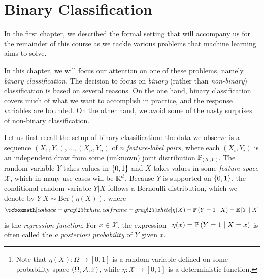 \chapter{Binary Classification}
\label{ch: binary classification}

In the first chapter, we described the formal setting that will accompany us for the remainder of this course as we tackle various problems that machine learning aims to solve.

In this chapter, we will focus our attention on one of these problems, namely \emph{binary classification}. The decision to focus on \emph{binary} (rather than \emph{non-binary}) classification is based on several reasons. On the one hand, binary classification covers much of what we want to accomplish in practice, and the response variables are bounded. On the other hand, we avoid some of the nasty surprises of non-binary classification.

Let us first recall the setup of binary classification: the data we observe is a sequence $(X_1, Y_1), \dots, (X_n, Y_n)$ of $n$ \emph{feature-label pairs}, where each $(X_i, Y_i)$ is an independent draw from some (unknown) joint distribution $\P_{(X, Y)}$. The random variable $Y$ takes values in $\set{0, 1}$ and $X$ takes values in some \emph{feature space} $\mathcal{X}$, which in many use cases will be $\R^d$. Because $Y$ is supported on $\set{0, 1}$, the conditional random variable $Y \vert X$ follows a Bernoulli distribution, which we denote by $Y \vert X \sim \mathrm{Ber}(\eta(X))$, where
\[
    \highlightMath{
        \eta(X) = \Pr{Y = 1 \given X} = \Ex{Y \given X}
    }
\]
is the \emph{regression function}. For $x \in \mathcal{X}$, the expression\footnote{Note that $\eta(X) \colon \Omega \to [0, 1]$ is a random variable defined on some probability space $(\Omega, \mathcal{A}, \P)$, while $\eta \colon \mathcal{X} \to [0, 1]$ is a deterministic function.} $\eta(x) = \Pr{Y = 1 \given X = x}$ is often called the \emph{a posteriori probability} of $Y$ given $x$. 
